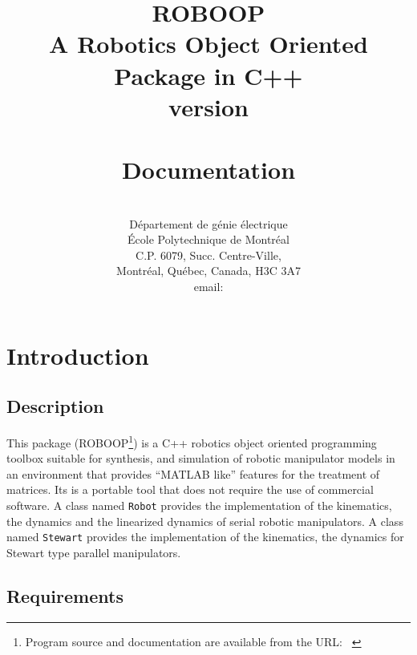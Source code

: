 \documentclass[11pt,fleqn,letterpaper]{report}
\begin{document}
\title{\textsf{ROBOOP} \\ A Robotics Object Oriented Package in C++ \\ version  \\
\ \\ Documentation}

\author{ \\ 
D\'epartement de g\'enie \'electrique \\
\'Ecole Polytechnique de Montr\'eal \\ C.P. 6079, Succ. Centre-Ville, \\
Montr\'eal, Qu\'ebec, Canada, H3C 3A7 \\ 
email: 
}

\maketitle 

\tableofcontents

\chapter{Introduction}

\section{Description}

This package (\textsf{ROBOOP}\footnote{Program source and
  documentation are available from the URL: {\tt
    }})
is a C++ robotics object oriented programming toolbox suitable for
synthesis, and simulation of robotic manipulator models in an
environment that provides ``\textsf{MATLAB} like'' features for the
treatment of matrices. Its is a portable tool that does not require
the use of commercial software. A class named {\tt Robot} provides the
implementation of the kinematics, the dynamics and the linearized
dynamics of serial robotic manipulators. A class named {\tt Stewart}
provides the implementation of the kinematics, the dynamics for
Stewart type parallel manipulators.

\section{Requirements}
\end{document}
